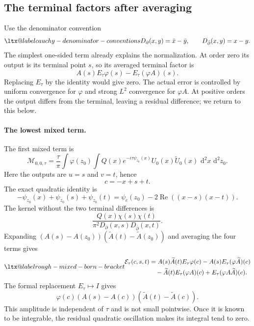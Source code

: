 \documentclass[a4paper,11pt]{article}
\makeatletter
\newcommand{\dd}{\,\text{d}}
\newcommand{\aliaslabel}[1]{\ltx@label{#1}}
\theoremstyle{plain}
\theoremstyle{definition}
\theoremstyle{remark}
\makeatother
\begin{document}
\subsection{The terminal factors after averaging}\label{subsec-model-born-terms}

Use the denominator convention
\begin{equation}\label{model-denominators}\aliaslabel{cauchy-denominator-conventions}
 D_\partial(x,y)=\bar x-\bar y,
 \qquad D_{\bar\partial}(x,y)=x-y.
\end{equation}
The simplest one-sided term already explains the normalization. At order zero its output is its terminal point $s$, so its averaged terminal factor is
\[
 A(s)E_\tau\varphi(s)-E_\tau(\varphi A)(s).
\]
Replacing $E_\tau$ by the identity would give zero. The actual error is controlled by uniform convergence for $\varphi$ and strong $L^2$ convergence for $\varphi A$. At positive orders the output differs from the terminal, leaving a residual difference; we return to this below.

\paragraph{The lowest mixed term.}
The first mixed term is
\begin{equation}\label{model-M00-def}
 \mathcal M_{0,0,\tau}
 =\frac\tau\pi\int\varphi(z_0)\int
 Q(x)e^{-i\tau\psi_{z_0}(x)}U_0(x)\widetilde U_0(x)
 \,\dd^2x\,\dd^2z_0.
\end{equation}
Here the outputs are $u=s$ and $v=t$, hence
\begin{equation}\label{model-M00-center}
 c=-x+s+t.
\end{equation}
The exact quadratic identity is
\begin{equation}\label{model-M00-normal-form}
 -\psi_{z_0}(x)+\psi_{z_0}(s)+\psi_{z_0}(t)
 =\psi_c(z_0)-2\operatorname{Re}((x-s)(x-t)).
\end{equation}
The kernel without the two terminal differences is
\[
 \frac{Q(x)\chi(s)\chi(t)}
 {\pi^2D_\partial(x,s)D_{\bar\partial}(x,t)}.
\]
Expanding $(A(s)-A(z_0))(\widetilde A(t)-\widetilde A(z_0))$ and averaging the four terms gives
\begin{equation}\label{model-mixed-bracket}\aliaslabel{rough-mixed-born-bracket}
\begin{aligned}
 \mathcal E_\tau(c,s,t)
 &=A(s)\widetilde A(t)E_\tau\varphi(c)
   -A(s)E_\tau(\varphi\widetilde A)(c)\\
 &\quad-\widetilde A(t)E_\tau(\varphi A)(c)
   +E_\tau(\varphi A\widetilde A)(c).
\end{aligned}
\end{equation}
The formal replacement $E_\tau\mapsto I$ gives
\[
 \varphi(c)(A(s)-A(c))(\widetilde A(t)-\widetilde A(c)).
\]
This amplitude is independent of $\tau$ and is not small pointwise. Once it is known to be integrable, the residual quadratic oscillation makes its integral tend to zero.
\end{document}
